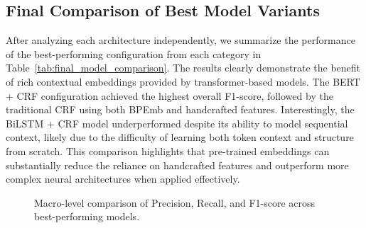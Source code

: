 \subsection{Final Comparison of Best Model Variants}
\label{subsec:final_comparison}
After analyzing each architecture independently, we summarize the performance of the best-performing configuration from each category in Table~\ref{tab:final_model_comparison}. The results clearly demonstrate the benefit of rich contextual embeddings provided by transformer-based models. The BERT + CRF configuration achieved the highest overall F1-score, followed by the traditional CRF using both BPEmb and handcrafted features. Interestingly, the BiLSTM + CRF model underperformed despite its ability to model sequential context, likely due to the difficulty of learning both token context and structure from scratch. This comparison highlights that pre-trained embeddings can substantially reduce the reliance on handcrafted features and outperform more complex neural architectures when applied effectively.
\begin{table}[h]
    \centering
    \caption{Final comparison between the best-performing models from each architecture family.}
    \label{tab:final_model_comparison}
\end{table}

\begin{figure}[H]
    \centering
    
    \caption{Macro-level comparison of Precision, Recall, and F1-score across best-performing models.}
    \label{fig:model_comparison_chart}
\end{figure}

